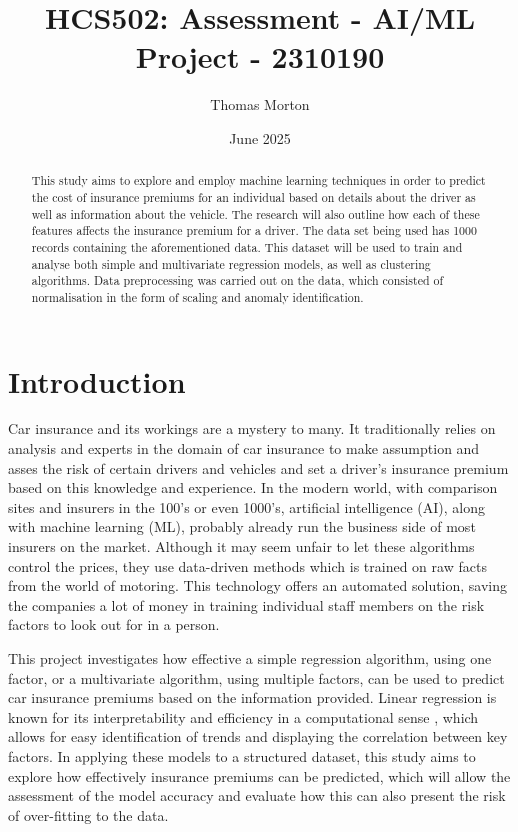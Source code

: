\documentclass{article}
\title{HCS502: Assessment - AI/ML Project - 2310190}
\author{Thomas Morton}
\date{June 2025}
\begin{document}
\maketitle

\begin{abstract}
This study aims to explore and employ machine learning techniques in order to predict the cost of insurance premiums for an individual based on details about the driver as well as information about the vehicle. The research will also outline how each of these features affects the insurance premium for a driver. The data set being used has 1000 records containing the aforementioned data. This dataset will be used to train and analyse both simple and multivariate regression models, as well as clustering algorithms. Data preprocessing was carried out on the data, which consisted of normalisation in the form of scaling and anomaly identification.

\end{abstract}

\newpage

\section{Introduction}
Car insurance and its workings are a mystery to many. It traditionally relies on analysis and experts in the domain of car insurance to make assumption and asses the risk of certain drivers and vehicles and set a driver's insurance premium based on this knowledge and experience. In the modern world, with comparison sites and insurers in the 100's or even 1000's, artificial intelligence (AI), along with machine learning (ML), probably already run the business side of most insurers on the market. Although it may seem unfair to let these algorithms control the prices, they use data-driven methods which is trained on raw facts from the world of motoring. This technology offers an automated solution, saving the companies a lot of money in training individual staff members on the risk factors to look out for in a person. 

This project investigates how effective a simple regression algorithm, using one factor, or a multivariate algorithm, using multiple factors, can be used to predict car insurance premiums based on the information provided. Linear regression is known for its interpretability and efficiency in a computational sense \cite{scikit_LR}, which allows for easy identification of trends and displaying the correlation between key factors. In applying these models to a structured dataset, this study aims to explore how effectively insurance premiums can be predicted, which will allow the assessment of the model accuracy and evaluate how this can also present the risk of over-fitting to the data.
\end{document}
